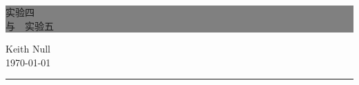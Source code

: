 \begin{titlepage} %


    \colorbox{grey}{
        \parbox[t]{0.93\textwidth}{ %
            \parbox[t]{0.91\textwidth}{ %
                \raggedleft %
                \fontsize{50pt}{80pt}\selectfont %
                \vspace{0.7cm} %

                  实验四 \\
                  与\ \ 实验五 \\


                \vspace{0.7cm} %
            }
        }
    }

    \vfill %


    \parbox[t]{0.93\textwidth}{ %
        \raggedleft %
        \large %
        {\Large Keith Null}\\[4pt] %
        \today\\

        \hfill\rule{0.2\linewidth}{1pt}%
    }

\end{titlepage}




